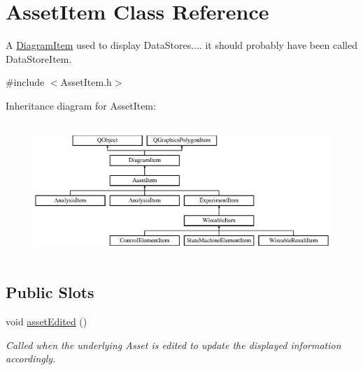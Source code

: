 \hypertarget{class_asset_item}{\section{Asset\-Item Class Reference}
\label{class_asset_item}
}


A \hyperlink{class_diagram_item}{Diagram\-Item} used to display Data\-Stores.... it should probably have been called Data\-Store\-Item.  




{\ttfamily \#include $<$Asset\-Item.\-h$>$}

Inheritance diagram for Asset\-Item\-:\begin{figure}[H]
\begin{center}
\leavevmode
\includegraphics[height=5.153375cm]{class_asset_item}
\end{center}
\end{figure}
\subsection*{Public Slots}
\begin{DoxyCompactItemize}
\item 
void \hyperlink{class_asset_item_ade5670323d8aceef0e622d6b48293ca1}{asset\-Edited} ()
\begin{DoxyCompactList}\small\item\em Called when the underlying Asset is edited to update the displayed information accordingly. \end{DoxyCompactList}\end{DoxyCompactItemize}
